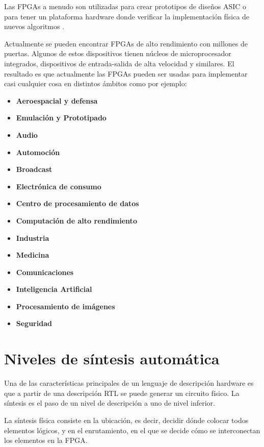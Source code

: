 Las FPGAs a menudo son utilizadas para crear prototipos de diseños ASIC o para tener un plataforma hardware donde verificar la implementación 
física de nuevos algoritmos \cite{maxfield1}. 

Actualmente se pueden encontrar FPGAs de alto rendimiento con millones de puertas. Algunos de estos dispositivos tienen núcleos de 
microprocesador integrados, dispositivos de entrada-salida de alta velocidad y similares. El resultado es que actualmente las FPGAs pueden ser 
usadas para implementar casi cualquier cosa en distintos ámbitos como por ejemplo:

\begin{itemize}
    \item \textbf{Aeroespacial y defensa} 
    \item \textbf{Emulación y Prototipado}
    \item \textbf{Audio} 
    \item \textbf{Automoción} 
    \item \textbf{Broadcast} 
    \item \textbf{Electrónica de consumo} 
    \item \textbf{Centro de procesamiento de datos} 
    \item \textbf{Computación de alto rendimiento} 
    \item \textbf{Industria} 
    \item \textbf{Medicina} 
    \item \textbf{Comunicaciones}
    \item \textbf{Inteligencia Artificial}
    \item \textbf{Procesamiento de imágenes}
    \item \textbf{Seguridad}
\end{itemize}

\section{Niveles de síntesis automática}  

Una de las características principales de un lenguaje de descripción hardware es que a partir de una descripción RTL se puede generar un 
circuito físico. La síntesis es el paso de un nivel de descripción a uno de nivel inferior.

La síntesis física consiste en la ubicación, es decir, decidir dónde colocar todos elementos lógicos, y en el enrutamiento, en el que se 
decide cómo se interconectan los elementos en la FPGA.

